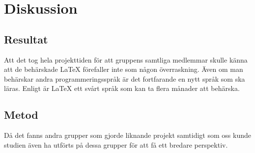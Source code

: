\section{Diskussion}
\subsection{Resultat}
Att det tog hela projekttiden för att gruppens samtliga medlemmar skulle känna att de behärskade {\LaTeX} förefaller inte som någon överraskning. Även om man behärskar andra programmeringsspråk är det fortfarande en nytt språk som ska läras. Enligt \citep{latexandfriends} är {\LaTeX} ett svårt språk som kan ta flera månader att behärska. 
\subsection{Metod}
Då det fanns andra grupper som gjorde liknande projekt samtidigt som oss kunde studien även ha utförts på dessa grupper för att få ett bredare perspektiv. 